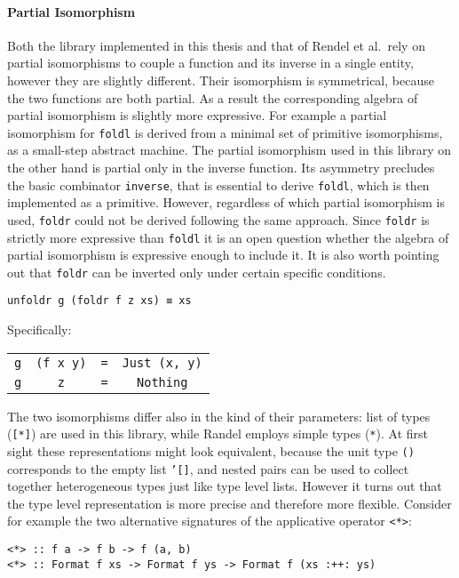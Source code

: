 \documentclass[../Thesis.tex]{subfiles}
\begin{document}
\paragraph{Partial Isomorphism}
Both the library implemented in this thesis and that of Rendel et al.\ 
rely on partial isomorphisms to couple a function and its inverse in a single entity, however they are slightly different.
Their isomorphism is symmetrical, because the two functions are both
partial. As a result the corresponding algebra of partial isomorphism 
is slightly more expressive. For example a partial isomorphism
for \texttt{foldl} is derived from a minimal set of primitive
isomorphisms, as a small-step abstract machine.
The partial isomorphism used in this library on the other hand
is partial only in the inverse function.
Its asymmetry precludes the basic combinator \texttt{inverse}, that
is essential to derive \texttt{foldl}, which is then implemented as a primitive. However, regardless of which partial isomorphism is used, 
\texttt{foldr} could not be derived following the same approach.
Since \texttt{foldr} is strictly more expressive than \texttt{foldl} it is an
open question whether the algebra of partial isomorphism is expressive
enough to include it.
It is also worth pointing out that \texttt{foldr} can be inverted only under certain specific conditions.
\begin{center}
\texttt{unfoldr g (foldr f z xs) ≡ xs}
\end{center}
Specifically:
\begin{center}
\begin{tabular}{cccc}
\texttt{g}  &\texttt{(f x y)} &\texttt{=} &\texttt{Just (x, y)} \\
\texttt{g}  &\texttt{z}        &\texttt{=} &\texttt{Nothing}
\end{tabular}
\end{center}

The two isomorphisms differ also in the kind of their parameters:
list of types (\texttt{[*]}) are used in this library, while
Randel employs simple types (\texttt{*}).
At first sight these representations might look equivalent, because
the unit type \texttt{()} corresponds to the empty list \texttt{'[]},
and nested pairs can be used to collect together heterogeneous types
just like type level lists.
However it turns out that the type level representation is more precise
and therefore more flexible.
Consider for example the two alternative signatures of the applicative operator \texttt{<*>}:

\begin{verbatim}
<*> :: f a -> f b -> f (a, b)
<*> :: Format f xs -> Format f ys -> Format f (xs :++: ys)
\end{verbatim}
\end{document}
